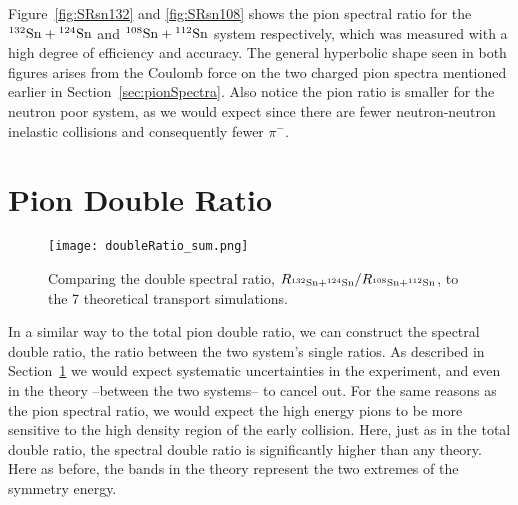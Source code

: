 
Figure~\ref{fig:SRsn132} and \ref{fig:SRsn108} shows the pion spectral ratio for the ${}^{132}\mathrm{Sn} + {}^{124}\mathrm{Sn}$ and ${}^{108}\mathrm{Sn} + {}^{112}\mathrm{Sn}$ system respectively, which was measured with a high degree of efficiency and accuracy. The general hyperbolic shape seen in both figures arises from the Coulomb force on the two charged pion spectra mentioned earlier in Section~\ref{sec:pionSpectra}. Also notice the pion ratio is smaller for the neutron poor system, as we would expect since there are fewer neutron-neutron inelastic collisions and consequently fewer $\pi^-$. 




\section{Pion Double Ratio}
\label{sec:doubleRatio}

\begin{figure}[!htb]
\centering
\texttt{[image: doubleRatio\_sum.png]}
\caption{Comparing the double spectral ratio, $R_{{}^{132}\mathrm{Sn} + {}^{124}\mathrm{Sn}}/R_{{}^{108}\mathrm{Sn} + {}^{112}\mathrm{Sn}}$, to the 7 theoretical transport simulations.}
\label{fig:spectraDR}
\end{figure}

In a similar way to the total pion double ratio, we can construct the spectral double ratio, the ratio between the two system's single ratios. As described in Section~\ref{sec:doubleRatio} we would expect systematic uncertainties in the experiment, and even in the theory --between the two systems-- to cancel out. For the same reasons as the pion spectral ratio, we would expect the high energy pions to be more sensitive to the high density region of the early collision. Here, just as in the total double ratio, the spectral double ratio is significantly higher than any theory. Here as before, the bands in the theory represent the two extremes of the symmetry energy. 
